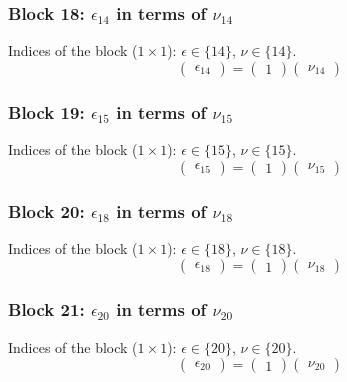 \subsubsection{Block 18: $\epsilon_{14}$ in terms of $\nu_{14}$}
Indices of the block ($1\times 1$): $\epsilon \in \{14\}$, $\nu \in \{14\}$.
\[
\begin{pmatrix}
\epsilon_{14}
\end{pmatrix}
=
\begin{pmatrix}
1
\end{pmatrix}
\begin{pmatrix}
\nu_{14}
\end{pmatrix}
\]

\subsubsection{Block 19: $\epsilon_{15}$ in terms of $\nu_{15}$}
Indices of the block ($1\times 1$): $\epsilon \in \{15\}$, $\nu \in \{15\}$.
\[
\begin{pmatrix}
\epsilon_{15}
\end{pmatrix}
=
\begin{pmatrix}
1
\end{pmatrix}
\begin{pmatrix}
\nu_{15}
\end{pmatrix}
\]

\subsubsection{Block 20: $\epsilon_{18}$ in terms of $\nu_{18}$}
Indices of the block ($1\times 1$): $\epsilon \in \{18\}$, $\nu \in \{18\}$.
\[
\begin{pmatrix}
\epsilon_{18}
\end{pmatrix}
=
\begin{pmatrix}
1
\end{pmatrix}
\begin{pmatrix}
\nu_{18}
\end{pmatrix}
\]

\subsubsection{Block 21: $\epsilon_{20}$ in terms of $\nu_{20}$}
Indices of the block ($1\times 1$): $\epsilon \in \{20\}$, $\nu \in \{20\}$.
\[
\begin{pmatrix}
\epsilon_{20}
\end{pmatrix}
=
\begin{pmatrix}
1
\end{pmatrix}
\begin{pmatrix}
\nu_{20}
\end{pmatrix}
\]

